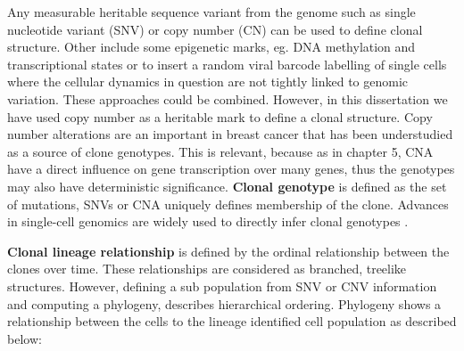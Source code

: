 Any measurable heritable sequence variant from the genome such as single nucleotide variant (SNV) or copy number (CN) can be used to define clonal structure. 
Other include some epigenetic marks, eg. DNA methylation and transcriptional states or to insert a random viral barcode labelling of single cells where the cellular dynamics in question are not tightly linked to genomic variation. These approaches could be combined. However, in this dissertation we have used copy number as a heritable mark to define a clonal structure. Copy number alterations are an important in breast cancer \cite{zhang2009copy, pollack2002microarray}
that has been understudied as a source of clone genotypes. This is relevant, because as in chapter 5, CNA have a direct influence on gene transcription over many genes, thus the genotypes may also have deterministic significance. \textbf{Clonal genotype} is defined as the set of mutations, SNVs or CNA uniquely defines membership of the clone. Advances in single-cell genomics are widely used to directly infer clonal genotypes \cite{macosko2015highly,laks2019clonal}. 


 \textbf{Clonal lineage relationship} is defined by the ordinal relationship between the clones over time. These relationships are considered as branched, treelike structures. However, defining a sub population from SNV or CNV information and computing a phylogeny, describes hierarchical ordering. Phylogeny shows a relationship between the cells to the lineage identified cell population as described below:
 
